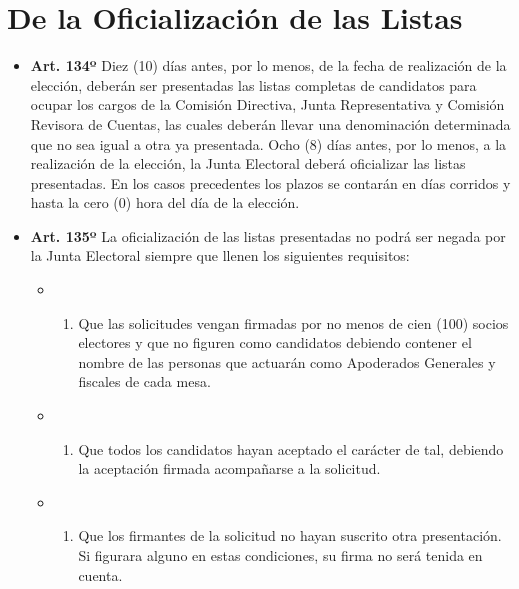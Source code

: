 \documentclass[]{book}
\providecommand{\tightlist}{%
  \setlength{\itemsep}{0pt}\setlength{\parskip}{0pt}}
\begin{document}
\hypertarget{de-la-oficializacion-de-las-listas}{%
\section{De la Oficialización de las Listas}\label{de-la-oficializacion-de-las-listas}}

\begin{itemize}
\tightlist
\item
  \textbf{Art. 134º}
  Diez (10) días antes, por lo menos, de la fecha de realización de la elección, deberán ser presentadas las listas completas de candidatos para ocupar los cargos de la Comisión Directiva, Junta Representativa y Comisión Revisora de Cuentas, las cuales deberán llevar una denominación determinada que no sea igual a otra ya presentada. Ocho (8) días antes, por lo menos, a la realización de la elección, la Junta Electoral deberá oficializar las listas presentadas. En los casos precedentes los plazos se contarán en días corridos y hasta la cero (0) hora del día de la elección.
\end{itemize}

\begin{itemize}
\tightlist
\item
  \textbf{Art. 135º}
  La oficialización de las listas presentadas no podrá ser negada por la Junta Electoral siempre que llenen los siguientes requisitos:

  \begin{itemize}
  \item
    \begin{enumerate}
    \def\labelenumi{\alph{enumi})}
    \tightlist
    \item
      Que las solicitudes vengan firmadas por no menos de cien (100) socios electores y que no figuren como candidatos debiendo contener el nombre de las personas que actuarán como Apoderados Generales y fiscales de cada mesa.
    \end{enumerate}
  \item
    \begin{enumerate}
    \def\labelenumi{\alph{enumi})}
    \setcounter{enumi}{1}
    \tightlist
    \item
      Que todos los candidatos hayan aceptado el carácter de tal, debiendo la aceptación firmada acompañarse a la solicitud.
    \end{enumerate}
  \item
    \begin{enumerate}
    \def\labelenumi{\alph{enumi})}
    \setcounter{enumi}{2}
    \tightlist
    \item
      Que los firmantes de la solicitud no hayan suscrito otra presentación. Si figurara alguno en estas condiciones, su firma no será tenida en cuenta.
    \end{enumerate}
  \end{itemize}
\end{itemize}
\end{document}
